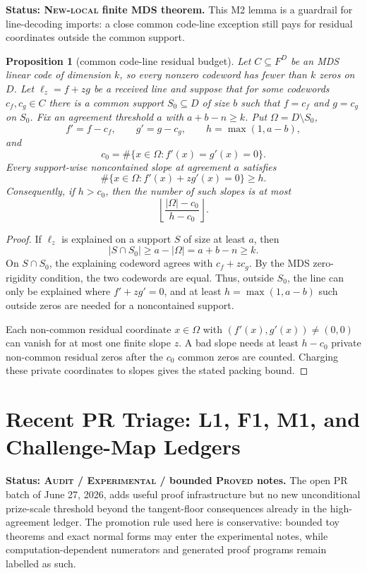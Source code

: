\documentclass[11pt]{article}
\newtheorem{proposition}{Proposition}
\begin{document}
\textbf{Status: \textsc{New-local} finite MDS theorem.}
This M2 lemma is a guardrail for line-decoding imports: a close common
code-line exception still pays for residual coordinates outside the common
support.

\begin{proposition}[common code-line residual budget]
\label{prop:common-residual}
Let \(C\subseteq F^D\) be an MDS linear code of dimension \(k\), so every
nonzero codeword has fewer than \(k\) zeros on \(D\).  Let
\(\ell_z=f+zg\) be a received line and suppose that for some codewords
\(c_f,c_g\in C\) there is a common support \(S_0\subseteq D\) of size \(b\)
such that \(f=c_f\) and \(g=c_g\) on \(S_0\).  Fix an agreement threshold
\(a\) with \(a+b-n\ge k\).  Put \(\Omega=D\setminus S_0\),
\[
  f'=f-c_f,\qquad g'=g-c_g,\qquad
  h=\max(1,a-b),
\]
and
\[
  c_0=\#\{x\in\Omega:f'(x)=g'(x)=0\}.
\]
Every support-wise noncontained slope at agreement \(a\) satisfies
\[
  \#\{x\in\Omega:f'(x)+zg'(x)=0\}\ge h.
\]
Consequently, if \(h>c_0\), then the number of such slopes is at most
\[
  \left\lfloor\frac{|\Omega|-c_0}{h-c_0}\right\rfloor.
\]
\end{proposition}

\begin{proof}
If \(\ell_z\) is explained on a support \(S\) of size at least \(a\), then
\[
  |S\cap S_0|\ge a-|\Omega|=a+b-n\ge k.
\]
On \(S\cap S_0\), the explaining codeword agrees with \(c_f+zc_g\).  By the
MDS zero-rigidity condition, the two codewords are equal.  Thus, outside
\(S_0\), the line can only be explained where \(f'+zg'=0\), and at least
\(h=\max(1,a-b)\) such outside zeros are needed for a noncontained support.

Each non-common residual coordinate \(x\in\Omega\) with \((f'(x),g'(x))\ne
(0,0)\) can vanish for at most one finite slope \(z\).  A bad slope needs at
least \(h-c_0\) private non-common residual zeros after the \(c_0\) common zeros
are counted.  Charging these private coordinates to slopes gives the stated
packing bound.
\end{proof}

\section{Recent PR Triage: L1, F1, M1, and Challenge-Map Ledgers}
\label{sec:recent-pr-triage}

\textbf{Status: \textsc{Audit} / \textsc{Experimental} / bounded
\textsc{Proved} notes.}
The open PR batch of June 27, 2026, adds useful proof infrastructure but no new
unconditional prize-scale threshold beyond the tangent-floor consequences already
in the high-agreement ledger.  The promotion rule used here is conservative:
bounded toy theorems and exact normal forms may enter the experimental notes,
while computation-dependent numerators and generated proof programs remain
labelled as such.
\end{document}
